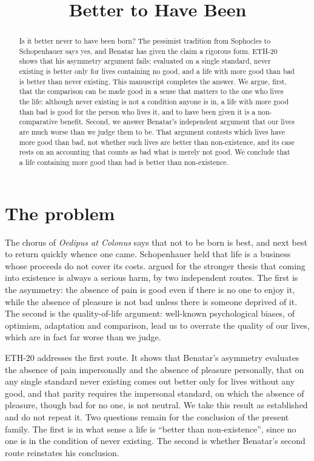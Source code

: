 \documentclass{situationist-preprint}
\title{Better to Have Been}
\begin{document}
\maketitle

\begin{abstract}
Is it better never to have been born? The pessimist tradition from Sophocles to Schopenhauer says yes, and Benatar has given the claim a rigorous form. ETH-20 shows that his asymmetry argument fails: evaluated on a single standard, never existing is better only for lives containing no good, and a life with more good than bad is better than never existing. This manuscript completes the answer. We argue, first, that the comparison can be made good in a sense that matters to the one who lives the life: although never existing is not a condition anyone is in, a life with more good than bad is good for the person who lives it, and to have been given it is a non-comparative benefit. Second, we answer Benatar's independent argument that our lives are much worse than we judge them to be. That argument contests which lives have more good than bad, not whether such lives are better than non-existence, and its case rests on an accounting that counts as bad what is merely not good. We conclude that a life containing more good than bad is better than non-existence.
\end{abstract}

\section{The problem}

The chorus of \emph{Oedipus at Colonus} says that not to be born is best, and next best to return quickly whence one came. Schopenhauer held that life is a business whose proceeds do not cover its costs. \citet{Benatar2006} argued for the stronger thesis that coming into existence is always a serious harm, by two independent routes. The first is the asymmetry: the absence of pain is good even if there is no one to enjoy it, while the absence of pleasure is not bad unless there is someone deprived of it. The second is the quality-of-life argument: well-known psychological biases, of optimism, adaptation and comparison, lead us to overrate the quality of our lives, which are in fact far worse than we judge.

ETH-20 addresses the first route. It shows that Benatar's asymmetry evaluates the absence of pain impersonally and the absence of pleasure personally, that on any single standard never existing comes out better only for lives without any good, and that parity requires the impersonal standard, on which the absence of pleasure, though bad for no one, is not neutral. We take this result as established and do not repeat it. Two questions remain for the conclusion of the present family. The first is in what sense a life is \enquote{better than non-existence}, since no one is in the condition of never existing. The second is whether Benatar's second route reinstates his conclusion.
\end{document}
